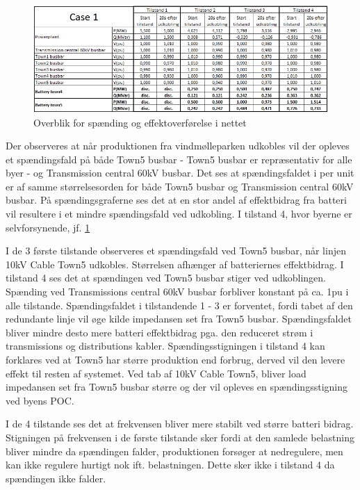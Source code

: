 \begin{figure}[H] %
	\centering
	\includegraphics[width=1\textwidth]{figurer/SmallDisturbance/Overview}
	\caption{Overblik for spænding og effektoverførelse i nettet}
	\label{fig:C3Overview}
\end{figure}

Der observeres at når produktionen fra vindmølleparken udkobles vil der opleves et spændingsfald på både Town5 busbar - Town5 busbar er repræsentativ for alle byer - og Transmission central 60kV busbar. Det ses at spændingsfaldet i per unit er af samme størrelsesorden for både Town5 busbar og Transmission central 60kV busbar. På spændingsgraferne ses det at en stor andel af effektbidrag fra batteri vil resultere i et mindre spændingsfald ved udkobling. I tilstand 4, hvor byerne er selvforsynende, jf. \ref{fig:C3Overview}



I de 3 første tilstande observeres et spændingsfald ved Town5 busbar, når linjen 10kV Cable Town5 udkobles. Størrelsen afhænger af batteriernes effektbidrag. I tilstand 4 ses det at spændingen ved Town5 busbar stiger ved udkoblingen. Spænding ved Transmissions central 60kV busbar forbliver konstant på ca. 1pu i alle tilstande. Spændingsfaldet i tilstandende 1 - 3 er forventet, fordi tabet af den redundante linje vil øge kilde impedansen set fra Town5 busbar. Spændingsfaldet bliver mindre desto mere batteri effektbidrag pga. den reduceret strøm i transmissions og distributions kabler. Spændingsstigningen i tilstand 4 kan forklares ved at Town5 har større produktion end forbrug, derved vil den levere effekt til resten af systemet. Ved tab af 10kV Cable Town5, bliver load impedansen set fra Town5 busbar større og der vil opleves en spændingsstigning ved byens POC.

I de 4 tilstande ses det at frekvensen bliver mere stabilt ved større batteri bidrag. Stigningen på frekvensen i de første tilstande sker fordi at den samlede belastning bliver mindre da spændingen falder, produktionen forsøger at nedregulere, men kan ikke regulere hurtigt nok ift. belastningen. Dette sker ikke i tilstand 4 da spændingen ikke falder.
